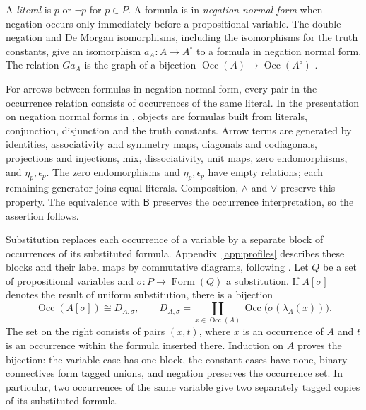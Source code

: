 \documentclass[11pt]{article}
\newcommand{\B}{\mathsf B}
\newcommand{\Occ}{\operatorname{Occ}}
\newcommand{\FormulaSet}{\operatorname{Form}}
\begin{document}
A \emph{literal} is $p$ or $\neg p$ for $p\in P$.
A formula is in \emph{negation normal form} when negation occurs only
immediately before a propositional variable. The double-negation and
De Morgan isomorphisms, including the isomorphisms for the truth
constants, give an isomorphism $a_A:A\to A^\circ$ to a formula in
negation normal form. The relation $Ga_A$ is the graph of a bijection
$\Occ(A)\to\Occ(A^\circ)$
\cite[\S14.1, pp.~313--315]{DP}.

For arrows between formulas in negation normal form, every pair in
the occurrence relation consists of occurrences of the same literal.
In the presentation on negation normal forms in
\cite[\S14.2, pp.~318--321]{DP}, objects are formulas built from
literals, conjunction, disjunction and the truth constants.
Arrow terms are generated by identities, associativity and symmetry
maps, diagonals and codiagonals, projections and injections, mix,
dissociativity, unit maps, zero endomorphisms, and $\eta_p,\epsilon_p$.
The zero endomorphisms and $\eta_p,\epsilon_p$ have empty relations;
each remaining generator joins equal literals.
Composition, $\wedge$ and $\vee$ preserve this property.
The equivalence with $\B$ preserves the occurrence interpretation,
so the assertion follows.

Substitution replaces each occurrence of a variable by a separate
block of occurrences of its substituted formula.
Appendix~\ref{app:profiles} describes these blocks and their label maps
by commutative diagrams, following \cite[\S9]{Notation}.
Let $Q$ be a set of propositional variables and
$\sigma:P\to\FormulaSet(Q)$ a substitution. If $A[\sigma]$ denotes the
result of uniform substitution, there is a bijection
\begin{equation}
 \Occ(A[\sigma])\cong D_{A,\sigma},\qquad
 D_{A,\sigma}=\coprod_{x\in\Occ(A)}
                  \Occ\bigl(\sigma(\lambda_A(x))\bigr).
 \label{eq:occ-substitution}
\end{equation}
The set on the right consists of pairs $(x,t)$, where $x$ is an
occurrence of $A$ and $t$ is an occurrence within the formula inserted there.
Induction on $A$ proves the bijection: the variable case has one
block, the constant cases have none, binary connectives form tagged
unions, and negation preserves the occurrence set. In particular,
two occurrences of the same variable give two separately tagged
copies of its substituted formula.
\end{document}
